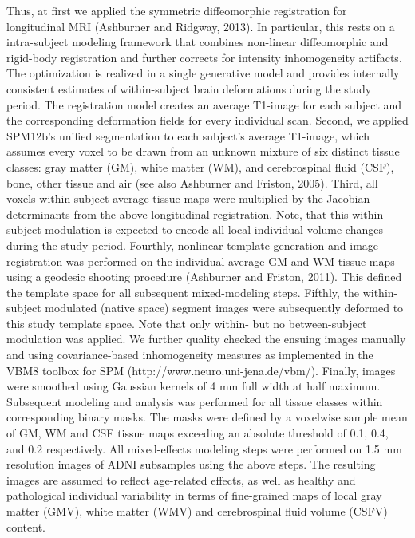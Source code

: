 \documentclass[final, paper=letter,5p,times,twocolumn]{elsarticle}
\theoremstyle{definition}
\begin{document}
Thus, at first we applied the symmetric diffeomorphic registration for longitudinal MRI (Ashburner and Ridgway, 2013). In particular, this rests on a intra-subject modeling framework that combines non-linear diffeomorphic and rigid-body registration and further corrects for intensity inhomogeneity artifacts. The optimization is realized in a single generative model and provides internally consistent estimates of within-subject brain deformations during the study period. The registration model creates an average T1-image for each subject and the corresponding deformation fields for every individual scan. Second, we applied SPM12b's unified segmentation to each subject's average T1-image, which assumes every voxel to be drawn from an unknown mixture of six distinct tissue classes: gray matter (GM), white matter (WM), and cerebrospinal fluid (CSF), bone, other tissue and air (see also Ashburner and Friston, 2005). Third, all voxels within-subject average tissue maps were multiplied by the Jacobian determinants from the above longitudinal registration. Note, that this within-subject modulation is expected to encode all local individual volume changes during the study period. Fourthly, nonlinear template generation and image registration was performed on the individual average GM and WM tissue maps using a geodesic shooting procedure (Ashburner and Friston, 2011). This defined the template space for all subsequent mixed-modeling steps. Fifthly, the within-subject modulated (native space) segment images were subsequently deformed to this study template space. Note that only within- but no between-subject modulation was applied. We further quality checked the ensuing images manually and using covariance-based inhomogeneity measures as implemented in the VBM8 toolbox for SPM (http://www.neuro.uni-jena.de/vbm/). Finally, images were smoothed using Gaussian kernels of 4 mm full width at half maximum. Subsequent modeling and analysis was performed for all tissue classes within corresponding binary masks. The masks were defined by a voxelwise sample mean of GM, WM and CSF tissue maps exceeding an absolute threshold of 0.1, 0.4, and 0.2 respectively. All mixed-effects modeling steps were performed on 1.5 mm resolution images of ADNI subsamples using the above steps. The resulting images are assumed to reflect age-related effects, as well as healthy and pathological individual variability in terms of fine-grained maps of local gray matter (GMV), white matter (WMV) and cerebrospinal fluid volume (CSFV) content.
\end{document}
